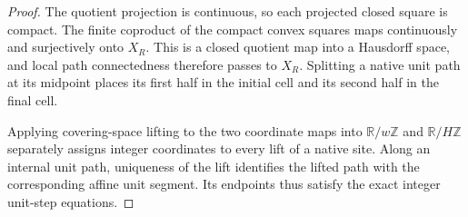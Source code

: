 \begin{proof}\leanok
    The quotient projection is continuous, so each projected closed
    square is compact. The finite coproduct of the compact convex
    squares maps continuously and surjectively onto $X_R$. This is a
    closed quotient map into a Hausdorff space, and local path
    connectedness therefore passes to $X_R$. Splitting a native unit
    path at its midpoint places its first half in the initial cell and
    its second half in the final cell.

    Applying covering-space lifting to the two coordinate maps into
    $\mathbb R/w\mathbb Z$ and $\mathbb R/H\mathbb Z$ separately
    assigns integer coordinates to every lift of a native site. Along an
    internal unit path, uniqueness of the lift identifies the lifted
    path with the corresponding affine unit segment. Its endpoints
    thus satisfy the exact integer unit-step equations.
\end{proof}

